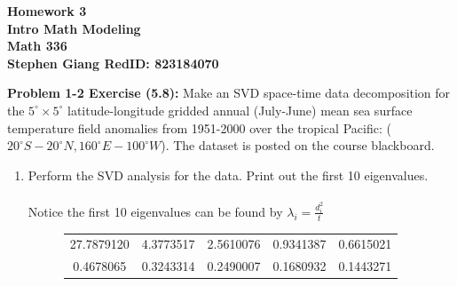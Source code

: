 \documentclass[11pt]{article}
\newcommand{\skipline}{\vspace{\baselineskip}}
\newenvironment{problem}[1]{\textbf{Problem #1:}}{\newpage}
\newenvironment{Shaded}{\begin{snugshade}}{\end{snugshade}}
\newcommand{\CommentTok}[1]{\textcolor[rgb]{0.56,0.35,0.01}{\textit{#1}}}
\newcommand{\DecValTok}[1]{\textcolor[rgb]{0.00,0.00,0.81}{#1}}
\newcommand{\KeywordTok}[1]{\textcolor[rgb]{0.13,0.29,0.53}{\textbf{#1}}}
\newcommand{\NormalTok}[1]{#1}
\newcommand{\OperatorTok}[1]{\textcolor[rgb]{0.81,0.36,0.00}{\textbf{#1}}}
\newcommand{\StringTok}[1]{\textcolor[rgb]{0.31,0.60,0.02}{#1}}
\begin{document}
	
	\begin{center}
		\textbf{Homework 3} \\
		\textbf{Intro Math Modeling} \\
		\textbf{Math 336} \\
		\textbf{Stephen Giang RedID: 823184070} \\
		\skipline \skipline
	\end{center}

	\begin{problem}{1-2 Exercise (5.8)}
		Make an SVD space-time data decomposition for the $5^\circ \times 5^\circ$
		latitude-longitude gridded annual (July-June) mean sea surface temperature field anomalies from 1951-2000 over
		the tropical Pacific: ($20^\circ S -20^\circ N, 160^\circ E -100^\circ W$). The dataset is posted on the course
		blackboard. 
		\begin{enumerate}[label = (\alph*)]
			\item Perform the SVD analysis for the data. Print out the first 10 eigenvalues.
			\\ \\
			Notice the first 10 eigenvalues can be found by $\lambda_i = \frac{d_i^2}{t}$
			\begin{figure}[h!]
				\centering
				\begin{tabular}{|c|c|c|c|c|}
					\hline
					27.7879120 & 4.3773517 & 2.5610076 & 0.9341387 & 0.6615021 \\
					0.4678065 & 0.3243314 & 0.2490007 & 0.1680932 & 0.1443271 \\
					\hline
				\end{tabular}
			\end{figure}
			
\begin{Shaded}
\end{Shaded}
\end{enumerate}
\end{problem}
\end{document}
